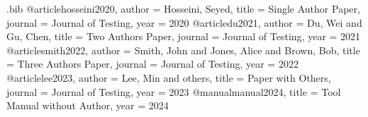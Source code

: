 \begin{filecontents*}{\jobname.bib}
@article{hosseini2020,
  author  = {Hosseini, Seyed},
  title   = {Single Author Paper},
  journal = {Journal of Testing},
  year    = {2020}
}
@article{du2021,
  author  = {Du, Wei and Gu, Chen},
  title   = {Two Authors Paper},
  journal = {Journal of Testing},
  year    = {2021}
}
@article{smith2022,
  author  = {Smith, John and Jones, Alice and Brown, Bob},
  title   = {Three Authors Paper},
  journal = {Journal of Testing},
  year    = {2022}
}
@article{lee2023,
  author  = {Lee, Min and others},
  title   = {Paper with Others},
  journal = {Journal of Testing},
  year    = {2023}
}
@manual{manual2024,
  title   = {Tool Manual without Author},
  year    = {2024}
}
\end{filecontents*}

\documentclass[uplatex]{jsarticle}
\usepackage{authcite}



\section*{authcite 動作確認テスト (authcite-test)}

\subsection*{1. 既定の挙動 (lang=ja, two=etal)}
\begin{itemize}
  \item 1人著者 [期待値: Hosseini[1]]: 
  \item 2人著者 [期待値: Duら[2]]: 
  \item 3人著者 [期待値: Smithら[3]]: 
  \item others  [期待値: Leeら[4]]: 
  \item 著者なし [期待値: [5]]: 
\end{itemize}

\subsection*{2. 2人共著連記 (two=both / both)}
\begin{itemize}
  \item two=both [期待値: DuとGu[2]]: 
  \item 省略形 both [期待値: DuとGu[2]]: 
\end{itemize}

